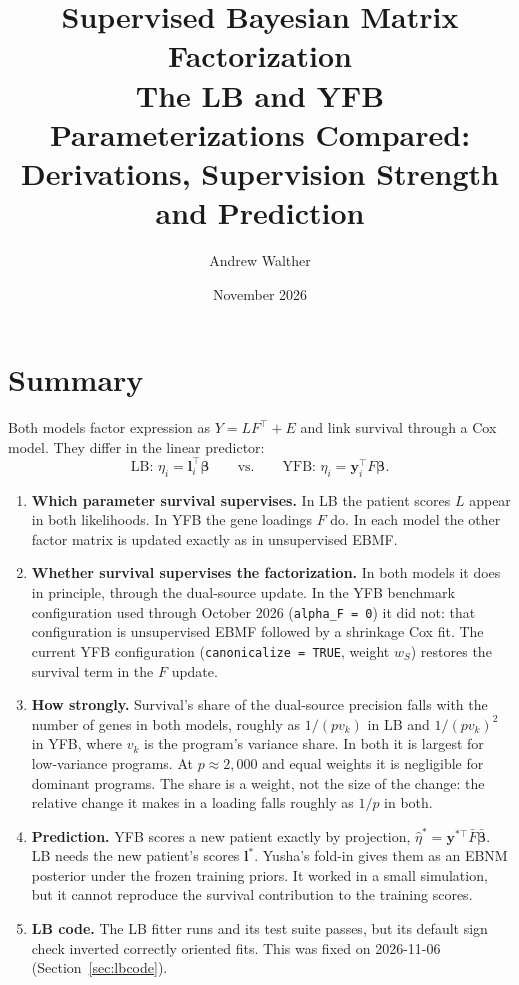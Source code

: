 \documentclass[11pt]{article}
\title{\textbf{Supervised Bayesian Matrix Factorization}\\
       \large The LB and YFB Parameterizations Compared:\\
       Derivations, Supervision Strength and Prediction}
\author{Andrew Walther}
\date{November 2026}
\newcommand{\ws}{w_S}
\begin{document}
\maketitle
\tableofcontents

\section{Summary}

Both models factor expression as $Y = LF^\top + E$ and link survival through a
Cox model. They differ in the linear predictor:
\[
  \text{LB: } \eta_i = \bm l_i^\top\bm\beta
  \qquad\text{vs.}\qquad
  \text{YFB: } \eta_i = \bm y_i^\top F\bm\beta .
\]
\begin{enumerate}
  \item \textbf{Which parameter survival supervises.} In LB the patient scores $L$
        appear in both likelihoods. In YFB the gene loadings $F$ do. In each
        model the other factor matrix is updated exactly as in unsupervised
        EBMF.
  \item \textbf{Whether survival supervises the factorization.} In both models
        it does in principle, through the dual-source update. In the YFB
        benchmark configuration used through October 2026
        (\texttt{alpha\_F = 0}) it did not: that configuration is unsupervised
        EBMF followed by a shrinkage Cox fit. The current YFB configuration
        (\texttt{canonicalize = TRUE}, weight $\ws$) restores the survival term in
        the $F$ update.
  \item \textbf{How strongly.} Survival's share of the dual-source precision
        falls with the number of genes in both models, roughly as $1/(pv_k)$ in
        LB and $1/(pv_k)^2$ in YFB, where $v_k$ is the program's variance
        share. In both it is largest for low-variance programs. At
        $p\approx 2{,}000$ and equal weights it is negligible for dominant
        programs. The share is a weight, not the size of the change: the
        relative change it makes in a loading falls roughly as $1/p$ in both.
  \item \textbf{Prediction.} YFB scores a new patient exactly by projection,
        $\hat\eta^* = \bm y^{*\top}\bar F\bar{\bm\beta}$. LB needs the new patient's
        scores $\bm l^*$. Yusha's fold-in gives them as an EBNM posterior under
        the frozen training priors. It worked in a small simulation, but it
        cannot reproduce the survival contribution to the training scores.
  \item \textbf{LB code.} The LB fitter runs and its test suite passes, but its
        default sign check inverted correctly oriented fits. This was fixed on
        2026-11-06 (Section~\ref{sec:lbcode}).
\end{enumerate}
\end{document}
